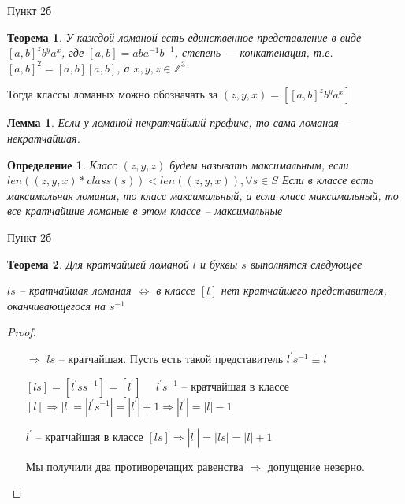 \documentclass[serif, ucs]{beamer}
\newtheorem{Def}{Определение}[section]
\newtheorem{Th}{Теорема}[section]
\newtheorem{Lm}{Лемма}[section]
\newcommand{\p}[1]{#1^{\prime}}
\begin{document}
\begin{frame}{Пункт 2б}
\begin{footnotesize}
\begin{Th}
	У каждой ломаной есть единственное представление в виде $[a, b]^zb^ya^x$, где $[a, b] = aba^{-1}b^{-1}$, степень --- конкатенация, т.е. $[a, b]^2 = [a, b][a, b]$, а $x, y, z\in\mathds{Z}^3$
\end{Th}

Тогда классы ломаных можно обозначать за $(z, y, x) = [[a, b]^zb^ya^x]$

\begin{Lm}
	Если у ломаной некратчайший префикс, то сама ломаная -- некратчайшая.
\end{Lm}
\begin{Def}
	Класс $(z, y, z)$ будем называть максимальным, если $len((z, y, x)*class(s))<len((z, y, x)) , \forall s\in S$
	Если в классе есть максимальная ломаная, то класс максимальный, а если класс максимальный, то все кратчайшие ломаные в этом классе -- максимальные
\end{Def}
\end{footnotesize}
\end{frame}
\begin{frame}{Пункт 2б}
\begin{footnotesize}
\begin{Th}
	Для кратчайшей ломаной $l$ и буквы $s$ выполнятся следующее 
	
	$ls$ -- кратчайшая ломаная $\Longleftrightarrow$ в классе $[l]$ нет кратчайшего представителя, оканчивающегося на $s^{-1}$ 
\end{Th}
\begin{proof}
	\begin{itemize}
		\item[$\Rightarrow$] $ls$ -- кратчайшая. Пусть есть такой представитель $\p ls^{-1}\equiv l$
		
		$[ls] = [\p l s s^{-1}] = [\p l]$ $\quad \p ls^{-1}$ -- кратчайшая в классе $[l]\Rightarrow |l|=|\p l s^{-1}| = |\p l| + 1\Rightarrow |\p l| = |l|-1$
		
		$\p l$ -- кратчайшая в классе $[ls]\Rightarrow |\p l | = |ls| = |l| + 1$
		
		Мы получили два противоречащих равенства $\Rightarrow $ допущение неверно.
	\end{itemize}
\end{proof}
\end{footnotesize}
\end{frame}
\end{document}
